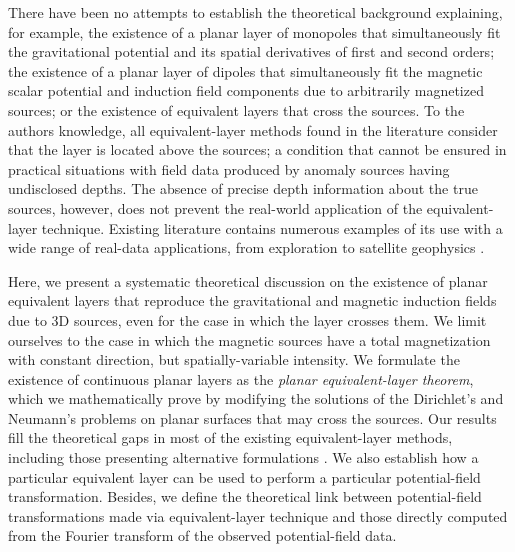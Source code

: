 \documentclass[manuscript,noblind]{geophysics}
\begin{document}
	There have been no attempts to establish the theoretical background explaining, for example,
	the existence of a planar layer of monopoles that simultaneously fit the gravitational  potential and 
	its spatial derivatives of first and second orders; 
	the existence of a planar layer of dipoles that simultaneously fit the magnetic scalar potential and
	induction field components due to arbitrarily magnetized sources; or the existence of 
	equivalent layers that cross the sources.
	To the authors knowledge, all equivalent-layer methods found in the literature 
	consider that the layer is located above the sources; 
	a condition that cannot be ensured in practical situations with field data produced by 
	anomaly sources having undisclosed depths.
	The absence of precise depth information about the true sources, however, 
	does not prevent the real-world application of the equivalent-layer technique.
	Existing literature contains numerous examples of its use with a wide range of real-data 
	applications, from exploration to satellite geophysics \citep[e.g.,][]{gonzalez_etal2022}.
	
	Here, we present a systematic theoretical discussion on the existence of planar equivalent layers 
	that reproduce the gravitational and magnetic induction fields due to 3D sources, 
	even for the case in which the layer crosses them.
	We limit ourselves to the case in which the magnetic
	sources have a total magnetization with constant direction, but spatially-variable intensity.
	We formulate the existence of continuous planar layers as the \textit{planar equivalent-layer theorem},
	which we mathematically prove by modifying the solutions of the Dirichlet's and Neumann's problems 
	on planar surfaces that may cross the sources. 
	Our results fill the theoretical gaps in most of the existing equivalent-layer methods, including 
	those presenting alternative formulations \citep[e.g.,][]{cordell1992, guspi_novara2009}.
	We also establish how a particular equivalent layer can be used to perform a particular potential-field transformation.
	Besides, we define the theoretical link between potential-field transformations made via equivalent-layer 
	technique and those directly computed from the Fourier transform of the observed potential-field data. 
	
\end{document}
